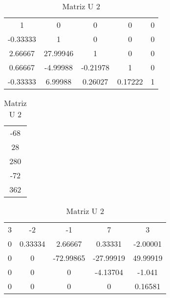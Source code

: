 \documentclass[12pt]{article}
\begin{document}
\begin{table}[htb]
  \begin{minipage}[b]{.36\linewidth}

    \centering
    \begin{tabular}{|c c c c c|}
        1                 &         0                   &           0             &   0     &   0   \\
        -0.33333          &         1                   &          0               &   0     &   0   \\
        2.66667           &         27.99946           &          1                &   0     &   0   \\
        0.66667          &         -4.99988           &           -0.21978          &   1    &     0  \\
        -0.33333          &         6.99988           &           0.26027           &   0.17222    &     1\\
    \end{tabular}
    \caption{Matriz LU 2}
    \label{tab:dir}


  \end{minipage}\hfill
  \begin{minipage}[b]{.46\linewidth}

    \centering
    \begin{tabular}{|c|}
        -68\\
        28\\
        280\\
        -72\\
        362\\
    \end{tabular}
    \caption{Resolução Matriz 1}
    \label{tab:dir}
  \end{minipage}\hfill
  \begin{minipage}[b]{.36\linewidth}

    \centering
    \begin{tabular}{|c c c c c|}
        3                 &         -2       &           -1             &   7     &   3   \\
        0          &         0.33334          &          2.66667        &   0.33331     &   -2.00001   \\
        0           &         0               &          -72.99865      &   -27.99919     &   49.99919   \\
        0          &         0                &           0             &   -4.13704    &     -1.041\\
        0          &         0                &           0             &   0    &     0.16581\\
    \end{tabular}
      \caption{Matriz U 2}
    \label{tab:esq}
  \end{minipage}

\end{table}
\end{document}
